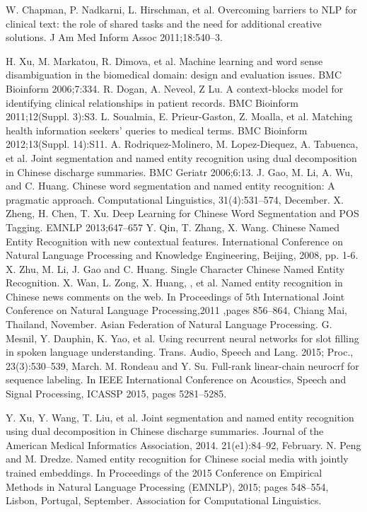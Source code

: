 \documentclass[conference]{IEEEtran}
\begin{document}
\begin{thebibliography}{00}
  W. Chapman, P. Nadkarni, L. Hirschman, et al. Overcoming barriers to NLP for clinical text: the role of shared tasks and the need for additional creative solutions. J Am Med Inform Assoc 2011;18:540–3.

 H. Xu, M. Markatou, R. Dimova, et al. Machine learning and word sense disambiguation in the biomedical domain: design and evaluation issues. BMC Bioinform 2006;7:334.
 R. Dogan, A. Neveol, Z Lu. A context-blocks model for identifying clinical relationships in patient records. BMC Bioinform 2011;12(Suppl. 3):S3.
 L. Soualmia, E. Prieur-Gaston, Z. Moalla, et al. Matching health information seekers’ queries to medical terms. BMC Bioinform 2012;13(Suppl. 14):S11.
 A. Rodriquez-Molinero, M. Lopez-Diequez, A. Tabuenca, et al. Joint segmentation and named entity recognition using dual decomposition in Chinese discharge summaries. BMC Geriatr 2006;6:13.
 J. Gao, M. Li, A. Wu, and C. Huang. Chinese word segmentation and named entity recognition: A pragmatic approach. Computational Linguistics, 31(4):531–574, December.
 X. Zheng, H. Chen, T. Xu. Deep Learning for Chinese Word Segmentation and POS Tagging. EMNLP 2013;647–657
  Y. Qin, T. Zhang, X. Wang. Chinese Named Entity Recognition with new contextual features. International Conference on Natural Language Processing and Knowledge Engineering, Beijing, 2008, pp. 1-6.
 X. Zhu, M. Li, J. Gao and C. Huang. Single Character Chinese Named Entity Recognition. 
 X. Wan, L. Zong, X. Huang, , et al.  Named entity recognition in Chinese news comments on the web. In Proceedings of 5th International Joint Conference on Natural Language Processing,2011 ,pages 856–864, Chiang Mai, Thailand, November. Asian Federation of Natural Language Processing.
 G. Mesnil, Y. Dauphin, K. Yao, et al. Using recurrent neural networks for slot filling in spoken language understanding. Trans. Audio, Speech and Lang. 2015; Proc., 23(3):530–539, March.
 M. Rondeau and Y. Su. Full-rank linear-chain neurocrf for sequence labeling. In IEEE International Conference on Acoustics, Speech and Signal Processing, ICASSP 2015, pages 5281–5285.

 Y. Xu, Y. Wang, T. Liu, et al. Joint segmentation and named entity recognition using dual decomposition in Chinese discharge summaries. Journal of the American Medical Informatics Association, 2014. 21(e1):84–92, February.
 N. Peng and M. Dredze.  Named entity recognition for Chinese social media with jointly trained embeddings. In Proceedings of the 2015 Conference on Empirical Methods in Natural Language Processing (EMNLP), 2015; pages 548–554, Lisbon, Portugal, September. Association for Computational Linguistics.


\end{thebibliography}
\end{document}
